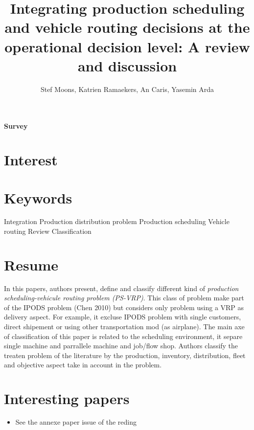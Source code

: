 \documentclass{article}
\title{Integrating production scheduling and vehicle routing decisions at the operational decision level: A review and discussion}
\author{Stef Moons, Katrien Ramaekers, An Caris, Yasemin Arda}
\begin{document}
\maketitle

\textbf{Survey}

\section*{Interest}


\section*{Keywords }
Integration
Production distribution problem
Production scheduling
Vehicle routing
Review
Classification

\section*{Resume}

In this papers, authors present, define and classify different kind of \textit{production scheduling-vehicule routing problem (PS-VRP)}. This class of problem make part of the IPODS problem (Chen 2010) but considers only problem using a VRP as delivery aspect. For example, it excluse IPODS problem with single customers, direct shipement or using other transportation mod (as airplane).
The main axe of classification of this paper is related to the scheduling environment, it separe single machine and parrallele machine and job/flow shop. Authors classify the treaten problem of the literature by the production, inventory, distribution, fleet and objective aspect take in account in the problem.

\section*{Interesting papers}
\begin{itemize}
\item See the annexe paper issue of the reding
\end{itemize}
\end{document}
